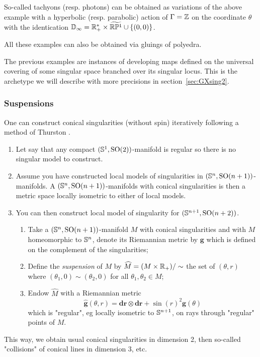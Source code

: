 \begin{ex}
\begin{itemize}
 \end{itemize}

So-called tachyons (resp. photons) can be obtained as variations of the above example with a hyperbolic (resp. parabolic)  action of $\Gamma=\mathbb{Z}$ on the coordinate $\theta$ with the identication $\mathbb{D}_\infty = \mathbb R_+^*\times \widetilde {\mathbb R\mathbb P^1} \cup \{(0,0)\}$.

All these examples can also be obtained via gluings of polyedra.
\end{ex}

\begin{rem}
 The previous examples are instances of developing maps defined on the universal covering of some singular space branched over its singular locus. This is the archetype we will describe with more precisions in section~\ref{sec:GXsing2}.
\end{rem}


\subsubsection{Suspensions} \label{sec:susp}

One can construct conical singularities (without spin) iteratively following a method of Thurston \cite{MR1668340}. 
\begin{enumerate}
 \item Let say that any compact $(\mathbb{S}^1,\mathrm{SO}(2))$-manifold is regular so there is no singular model to construct. 
 \item Assume you have constructed local models of singularities in $(\mathbb{S}^n,\mathrm{SO}(n+1))$-manifolds. A $(\mathbb{S}^n,\mathrm{SO}(n+1))$-manifolds with conical singularities is then a metric space locally isometric to either of local models.
 \item You can then construct local model of singularity for $(\mathbb{S}^{n+1},\mathrm{SO}(n+2))$.
 \begin{enumerate}
 \item Take a $(\mathbb{S}^n,\mathrm{SO}(n+1))$-manifold $M$ with conical singularities and with $M$ homeomorphic to $\mathbb{S}^n$,  denote its Riemannian metric by $\mathbf{g}$ which is defined on the complement of the singularities;  
 \item Define the {\it suspension} of $M$ by 
 $\widehat M = (M\times \mathbb R_+)/\sim$ the set of $(\theta,r)$ where $(\theta_1,0)\sim (\theta_2,0)$ for all $\theta_1,\theta_2\in M$; 
 \item Endow $\widehat M$ with a Riemannian metric $$\widehat{\mathbf{g}}(\theta,r) = \mathbf{d r}\otimes \mathbf{d r}+  \sin(r)^2 \mathbf{g}(\theta)$$ which is "regular", eg locally isometric to $\mathbb{S}^{n+1}$, on rays through "regular" points of $M$.  
 \end{enumerate}
\end{enumerate}
This way, we obtain usual conical singularities in dimension 2, then so-called "collisions" of conical lines in dimension 3, etc.

